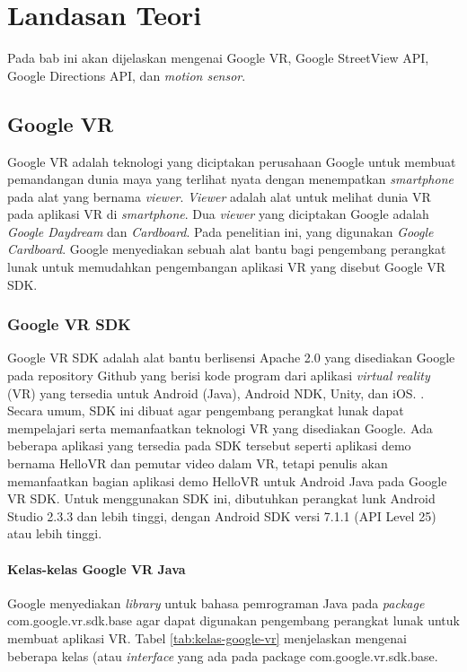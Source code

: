 \chapter{Landasan Teori}
\label{chap:teori}
Pada bab ini akan dijelaskan mengenai Google VR, Google StreetView API, Google Directions API, dan \textit{motion sensor}.

\section{Google VR}
\label{sec:google-vr} 
Google VR adalah teknologi yang diciptakan perusahaan Google untuk membuat pemandangan dunia maya yang terlihat nyata dengan menempatkan \textit{smartphone} pada alat yang bernama \textit{viewer}. \textit{Viewer} adalah alat untuk melihat dunia VR pada aplikasi VR di \textit{smartphone}. Dua \textit{viewer} yang diciptakan Google adalah \textit{Google Daydream} dan \textit{Cardboard}. Pada penelitian ini, yang digunakan \textit{Google Cardboard}. Google menyediakan sebuah alat bantu bagi pengembang perangkat lunak untuk memudahkan pengembangan aplikasi VR yang disebut Google VR SDK.

\subsection{Google VR SDK}
Google VR SDK adalah alat bantu berlisensi Apache 2.0 yang disediakan Google pada repository Github yang berisi kode program dari aplikasi {\it virtual reality} (VR)  yang tersedia untuk Android (Java), Android NDK, Unity, dan iOS. . Secara umum, SDK ini dibuat agar pengembang perangkat lunak dapat mempelajari serta memanfaatkan teknologi VR yang disediakan Google. Ada beberapa aplikasi yang tersedia pada SDK tersebut seperti aplikasi demo bernama HelloVR dan pemutar video dalam VR, tetapi penulis akan memanfaatkan bagian aplikasi demo HelloVR untuk Android Java pada Google VR SDK. Untuk menggunakan SDK ini, dibutuhkan perangkat lunk Android Studio 2.3.3 dan lebih tinggi, dengan Android SDK versi 7.1.1 (API Level 25) atau lebih tinggi. 

\subsubsection{Kelas-kelas Google VR Java}
Google menyediakan \textit{library} untuk bahasa pemrograman Java pada \textit{package} com.google.vr.sdk.base agar dapat digunakan pengembang perangkat lunak untuk membuat aplikasi VR. Tabel \ref{tab:kelas-google-vr} menjelaskan mengenai beberapa kelas (atau \textit{interface} yang ada pada package com.google.vr.sdk.base. 

